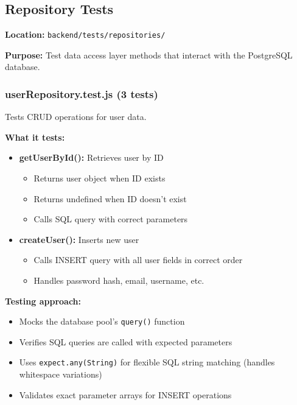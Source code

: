 \subsection{Repository Tests}
\label{subsec:repository_tests}

\textbf{Location:} \texttt{backend/tests/repositories/}

\textbf{Purpose:} Test data access layer methods that interact with the PostgreSQL database.

\subsubsection{userRepository.test.js (3 tests)}
\label{subsubsec:user_repository_test}

Tests CRUD operations for user data.

\textbf{What it tests:}
\begin{itemize}
    \item \textbf{getUserById():} Retrieves user by ID
    \begin{itemize}
        \item Returns user object when ID exists
        \item Returns undefined when ID doesn't exist
        \item Calls SQL query with correct parameters
    \end{itemize}
    
    \item \textbf{createUser():} Inserts new user
    \begin{itemize}
        \item Calls INSERT query with all user fields in correct order
        \item Handles password hash, email, username, etc.
    \end{itemize}
\end{itemize}

\textbf{Testing approach:}
\begin{itemize}
    \item Mocks the database pool's \texttt{query()} function
    \item Verifies SQL queries are called with expected parameters
    \item Uses \texttt{expect.any(String)} for flexible SQL string matching (handles whitespace variations)
    \item Validates exact parameter arrays for INSERT operations
\end{itemize}


